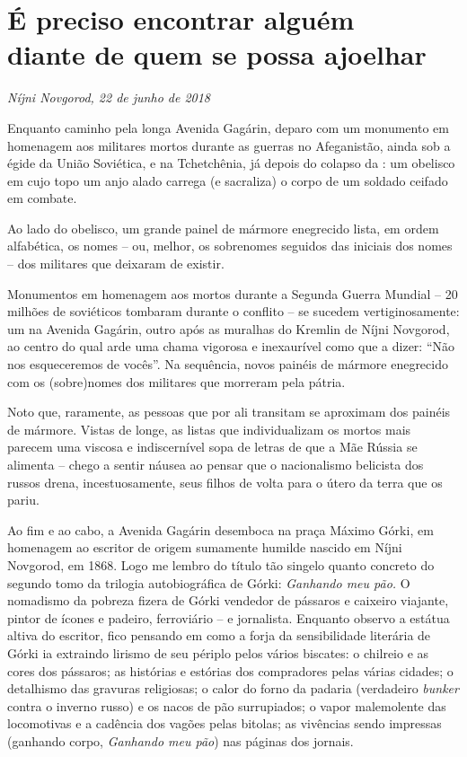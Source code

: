 \chapter*{É preciso encontrar alguém\\diante de quem se possa ajoelhar}

\begin{flushright}
\emph{Níjni Novgorod, 22 de junho de 2018}
\end{flushright}

Enquanto caminho pela longa Avenida Gagárin, deparo com um monumento em
homenagem aos militares mortos durante as guerras no Afeganistão, ainda
sob a égide da União Soviética, e na Tchetchênia, já depois do colapso
da : um obelisco em cujo topo um anjo alado carrega (e sacraliza) o
corpo de um soldado ceifado em combate.

Ao lado do obelisco, um grande painel de mármore enegrecido lista, em
ordem alfabética, os nomes -- ou, melhor, os sobrenomes seguidos das
iniciais dos nomes -- dos militares que deixaram de existir.

Monumentos em homenagem aos mortos durante a Segunda Guerra Mundial --
20 milhões de soviéticos tombaram durante o conflito -- se sucedem
vertiginosamente: um na Avenida Gagárin, outro após as muralhas do
Kremlin de Níjni Novgorod, ao centro do qual arde uma chama vigorosa e
inexaurível como que a dizer: ``Não nos esqueceremos de vocês''. Na
sequência, novos painéis de mármore enegrecido com os (sobre)nomes dos
militares que morreram pela pátria.

Noto que, raramente, as pessoas que por ali transitam se aproximam dos
painéis de mármore. Vistas de longe, as listas que individualizam os
mortos mais parecem uma viscosa e indiscernível sopa de letras de que a
Mãe Rússia se alimenta -- chego a sentir náusea ao pensar que o
nacionalismo belicista dos russos drena, incestuosamente, seus filhos de
volta para o útero da terra que os pariu.

Ao fim e ao cabo, a Avenida Gagárin desemboca na praça Máximo Górki, em
homenagem ao escritor de origem sumamente humilde nascido em Níjni
Novgorod, em 1868. Logo me lembro do título tão singelo quanto concreto
do segundo tomo da trilogia autobiográfica de Górki: \emph{Ganhando meu
pão.} O nomadismo da pobreza fizera de Górki vendedor de pássaros e
caixeiro viajante, pintor de ícones e padeiro, ferroviário -- e
jornalista. Enquanto observo a estátua altiva do escritor, fico pensando
em como a forja da sensibilidade literária de Górki ia extraindo lirismo
de seu périplo pelos vários biscates: o chilreio e as cores dos
pássaros; as histórias e estórias dos compradores pelas várias cidades;
o detalhismo das gravuras religiosas; o calor do forno da padaria
(verdadeiro \emph{bunker} contra o inverno russo) e os nacos de pão
surrupiados; o vapor malemolente das locomotivas e a cadência dos vagões
pelas bitolas; as vivências sendo impressas (ganhando corpo,
\emph{Ganhando meu pão}) nas páginas dos jornais.

